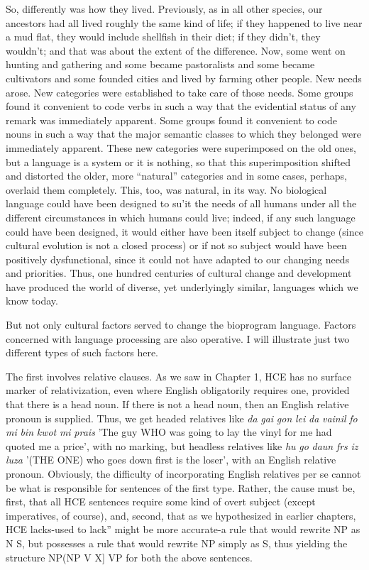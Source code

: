 So, differently was how they lived. Previously, as in all other species, our ancestors had all lived roughly the same kind of life; if they happened to live near a mud flat, they would include shellfish in their diet; if they didn't, they wouldn't; and that was about the extent of the difference. Now, some went on hunting and gathering and some became pastoralists and some became cultivators and some founded cities and lived by farming other people. New needs arose. New cate\-gories were established to take care of those needs. Some groups found it convenient to code verbs in such a way that the evidential status of any remark was immediately apparent. Some groups found it con\-venient to code nouns in such a way that the major semantic classes
to which they belonged were immediately apparent. These new cate\-gories were superimposed on the old ones, but a language is a system or it is nothing, so that this superimposition shifted and distorted the older, more ``natural'' categories and in some cases, perhaps, overlaid them completely. This, too, was natural, in its way. No biological language could have been designed to su'it the needs of all humans under all the different circumstances in which humans could live; indeed, if any such language could have been designed, it would either have been itself subject to change (since cultural evolution is not a closed process) or if not so subject would have been positively dys\-functional, since it could not have adapted to our changing needs and priorities. Thus, one hundred centuries of cultural change and develop\-ment have produced the world of diverse, yet underlyingly similar, languages which we know today.

But not only cultural factors served to change the bioprogram language. Factors concerned with language processing are also opera\-tive. I will illustrate just two different types of such factors here.

The first involves relative clauses. As we saw in Chapter 1, HCE has no surface marker of relativization, even where English obligatorily requires one, provided that there is a head noun. If there is not a head noun, then an English relative pronoun is supplied. Thus, we get headed relatives like \textit{da} \textit{gai} \textit{gon} \textit{lei} \textit{da} \textit{vainil} \textit{fo} \textit{mi} \textit{bin} \textit{kwot} \textit{mi} \textit{prais} 'The guy WHO was going to lay the vinyl for me had quoted me a price', with no marking, but headless relatives like \textit{hu} \textit{go} \textit{daun} \textit{frs} \textit{iz} \textit{luza} '(THE ONE) who goes down first is the loser', with an English relative pro\-noun. Obviously, the difficulty of incorporating English relatives per se cannot be what is responsible for sentences of the first type. Rather, the cause must be, first, that all HCE sentences require some kind of overt subject (except imperatives, of course), and, second, that as we hypothesized in earlier chapters, HCE lacks-{\textquotedbl}used to lack'' might be more accurate-a rule that would rewrite NP as N S, but possesses a rule that would rewrite NP simply as S, thus yielding the structure NP(NP V X] VP for both the above sentences.

